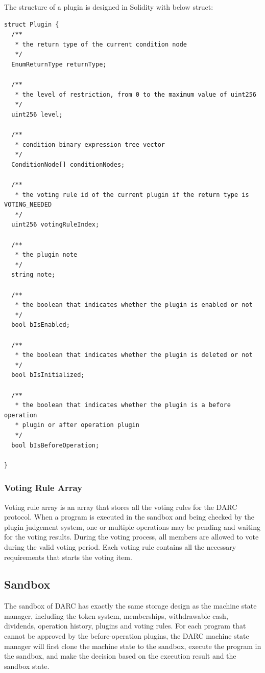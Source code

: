 \documentclass[main.tex]{subfiles}
\begin{document}
The structure of a plugin is designed in Solidity with below struct:

\begin{verbatim}
struct Plugin {
  /**
   * the return type of the current condition node
   */
  EnumReturnType returnType;

  /**
   * the level of restriction, from 0 to the maximum value of uint256
   */
  uint256 level;

  /**
   * condition binary expression tree vector
   */
  ConditionNode[] conditionNodes;

  /**
   * the voting rule id of the current plugin if the return type is VOTING_NEEDED
   */
  uint256 votingRuleIndex;

  /**
   * the plugin note
   */
  string note;

  /**
   * the boolean that indicates whether the plugin is enabled or not
   */
  bool bIsEnabled;

  /**
   * the boolean that indicates whether the plugin is deleted or not
   */
  bool bIsInitialized;

  /**
   * the boolean that indicates whether the plugin is a before operation 
   * plugin or after operation plugin
   */
  bool bIsBeforeOperation;
  
}
\end{verbatim}

\subsubsection{Voting Rule Array}

Voting rule array is an array that stores all the voting rules for the DARC protocol. When a program is executed in the sandbox and being checked by the plugin judgement system, one or multiple operations may be pending and waiting for the voting results. During the voting process, all members are allowed to vote during the valid voting period. Each voting rule contains all the necessary requirements that starts the voting item.


\subsection{Sandbox}

The sandbox of DARC has exactly the same storage design as the machine state manager, including the token system, memberships, withdrawable cash, dividends, operation history, plugins and voting rules. For each program that cannot be approved by the before-operation plugins, the DARC machine state manager will first clone the machine state to the sandbox, execute the program in the sandbox, and make the decision based on the execution result and the sandbox state. 
\end{document}
